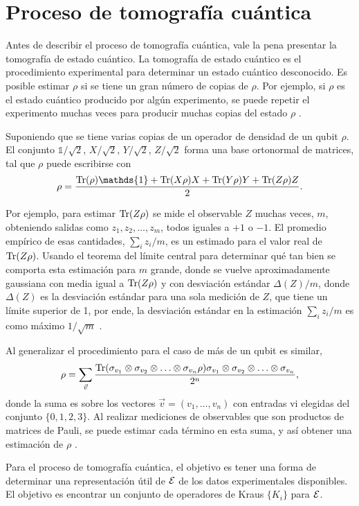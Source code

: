 \section{Proceso de tomografía cuántica} %

Antes de describir el proceso de tomografía cuántica, vale la pena presentar la tomografía de estado cuántico. La tomografía de estado cuántico es el procedimiento experimental para determinar un estado cuántico desconocido. Es posible estimar $\rho$ si se tiene un gran número de copias de $\rho$. Por ejemplo, si $\rho$ es el estado cuántico producido por algún experimento, se puede repetir el experimento muchas veces para producir muchas copias del estado $\rho$ {\cite{nielsen_chuang_2010}}. 

Suponiendo que se tiene varias copias de un operador de densidad de un qubit $\rho$. El conjunto $\mathds{1}/\sqrt{2}$, $X/\sqrt{2}$, $Y/\sqrt{2}$, $Z/\sqrt{2}$ forma una base ortonormal de matrices, tal que $\rho$  puede escribirse con \[\rho=\dfrac{\tr(\rho)\mathds{1}+\tr(X\rho)X+\tr(Y\rho)Y+\tr(Z\rho)Z}{2}.\]

Por ejemplo, para estimar ${\rm Tr}(Z\rho)$ se mide el observable $Z$ muchas veces, $m$, obteniendo salidas como $z_1,z_2,\ldots,z_m$, todos iguales a $+1$ o $-1$. El promedio empírico de esas cantidades, $\sum_i z_i/m$, es un estimado para el valor real de ${\rm Tr}(Z\rho)$. Usando el teorema del límite central para determinar qué tan bien se comporta esta estimación para $m$ grande, donde se vuelve aproximadamente gaussiana con media igual a ${\rm Tr}(Z\rho)$ y con desviación estándar  $\Delta(Z)/ m$, donde $\Delta(Z)$ es la desviación estándar para una sola medición de $Z$, que tiene un límite superior de 1, por ende, la desviación estándar en la estimación $\sum_i z_i/m$ es como máximo $1/\sqrt{m}$ {\cite{nielsen_chuang_2010}}. 

Al generalizar el procedimiento para el caso de más de un qubit es similar,
\[\rho=\sum_{\vec{v}}\dfrac{{\rm Tr}(\sigma_{v_1}\otimes\sigma_{v_2}\otimes \ldots \otimes \sigma_{v_n}\rho)\sigma_{v_1}\otimes\sigma_{v_2}\otimes \ldots \otimes \sigma_{v_n}}{2^n},\] donde la suma es sobre los vectores $\vec{v} = (v_1 ,\ldots, v_n )$ con entradas vi elegidas del conjunto $\{0, 1, 2, 3\}$. Al realizar mediciones de observables que son productos de matrices de Pauli, se puede estimar cada término en esta suma, y así obtener una estimación de $\rho$ {\cite{nielsen_chuang_2010}}.

Para el proceso de tomografía cuántica, el objetivo es tener una forma de determinar una representación útil de $\mathcal{E}$  de los datos experimentales disponibles. El objetivo es encontrar un conjunto de operadores de Kraus $\{K_i\}$ para $\mathcal{E}$.


